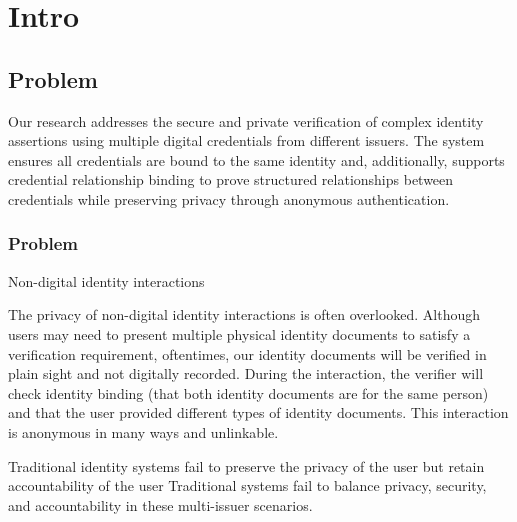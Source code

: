 \section{Intro}
\subsection{Problem}
Our research addresses the secure and private verification of complex identity assertions using multiple digital credentials from different issuers. The system ensures all credentials are bound to the same identity and, additionally, supports credential relationship binding to prove structured relationships between credentials while preserving privacy through anonymous authentication.


\subsubsection{Problem}

Non-digital identity interactions 

The privacy of non-digital identity interactions is often overlooked. Although users may need to present multiple physical identity documents to satisfy a verification requirement, oftentimes, our identity documents will be verified in plain sight and not digitally recorded. During the interaction, the verifier will check identity binding (that both identity documents are for the same person) and that the user provided different types of identity documents. This interaction is anonymous in many ways and unlinkable. 

Traditional identity systems fail to preserve the privacy of the user but retain accountability of the user 
Traditional systems fail to balance privacy, security, and accountability in these multi-issuer scenarios.

